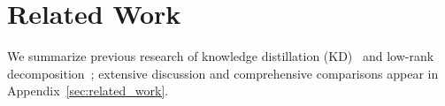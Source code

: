 \documentclass{article} %
\begin{document}

\vspace{-0.2cm}
\section{Related Work}
We summarize previous research of knowledge distillation (KD)~\citep{hinton2015distilling} and low-rank decomposition~\citep{denton2014exploiting}; extensive discussion and comprehensive comparisons appear in Appendix~\ref{sec:related_work}.


\end{document}
